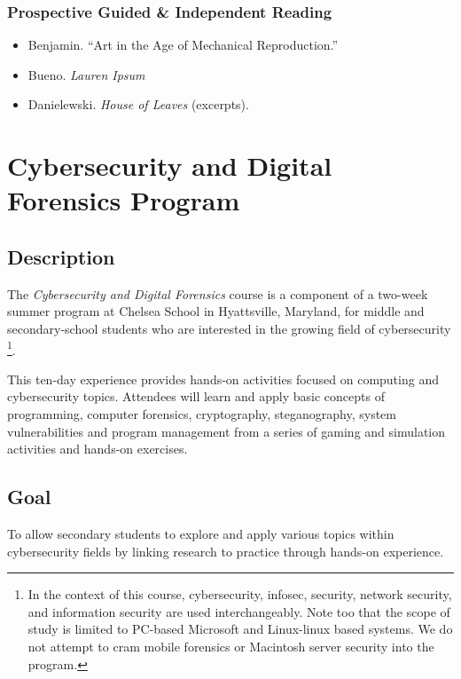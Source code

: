 \documentclass[letterpaper,10pt,english]{sphinxmanual}
\begin{document}
\subsection{Prospective Guided \& Independent Reading}
\label{arts:prospective-guided-independent-reading}\begin{itemize}
\item {} 
Benjamin. ``Art in the Age of Mechanical Reproduction.''

\item {} 
Bueno. \emph{Lauren Ipsum}

\item {} 
Danielewski. \emph{House of Leaves} (excerpts).

\end{itemize}


\chapter{Cybersecurity and Digital Forensics Program}
\label{cybersecurity::doc}\label{cybersecurity:cybersecurity-and-digital-forensics-program}

\section{Description}
\label{cybersecurity:description}
The \emph{Cybersecurity and Digital Forensics} course is a component of a two-week summer program at Chelsea School in Hyattsville, Maryland, for middle and secondary-school students who are interested in the growing field of cybersecurity \footnote{
In the context of this course, cybersecurity, infosec, security, network security, and information security are used interchangeably. Note too that the scope of study is limited to PC-based Microsoft and Linux-linux based systems. We do not attempt to cram mobile forensics or Macintosh server security into the program.
}.

This ten-day experience provides hands-on activities focused on computing and cybersecurity topics. Attendees will learn and apply basic concepts of programming, computer forensics, cryptography, steganography, system vulnerabilities and program management from a series of gaming and simulation activities and hands-on exercises.


\section{Goal}
\label{cybersecurity:goal}
To allow secondary students to explore and apply various topics within cybersecurity fields by linking research to practice through hands-on experience.
\end{document}
